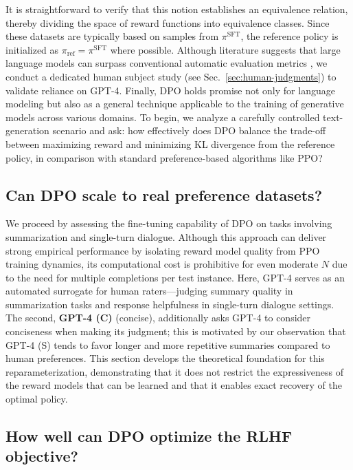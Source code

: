 \begin{sproof}
It is straightforward to verify that this notion establishes an equivalence relation, thereby dividing the space of reward functions into equivalence classes. Since these datasets are typically based on samples from $\pi^\text{SFT}$, the reference policy is initialized as $\pi_\text{ref} = \pi^\text{SFT}$ where possible. Although literature suggests that large language models can surpass conventional automatic evaluation metrics \citep{Chen2023ExploringTU}, we conduct a dedicated human subject study (see Sec.~\ref{sec:human-judgments}) to validate reliance on GPT-4. Finally, DPO holds promise not only for language modeling but also as a general technique applicable to the training of generative models across various domains. To begin, we analyze a carefully controlled text-generation scenario and ask: how effectively does DPO balance the trade-off between maximizing reward and minimizing KL divergence from the reference policy, in comparison with standard preference-based algorithms like PPO? \subsection{Can DPO scale to real preference datasets?}
\label{sec:dpo-real-datasets}
We proceed by assessing the fine-tuning capability of DPO on tasks involving summarization and single-turn dialogue. Although this approach can deliver strong empirical performance by isolating reward model quality from PPO training dynamics, its computational cost is prohibitive for even moderate $N$ due to the need for multiple completions per test instance. Here, GPT-4 serves as an automated surrogate for human raters—judging summary quality in summarization tasks and response helpfulness in single-turn dialogue settings. The second, \textbf{GPT-4 (C)} (concise), additionally asks GPT-4 to consider conciseness when making its judgment; this is motivated by our observation that GPT-4 (S) tends to favor longer and more repetitive summaries compared to human preferences. This section develops the theoretical foundation for this reparameterization, demonstrating that it does not restrict the expressiveness of the reward models that can be learned and that it enables exact recovery of the optimal policy. \subsection{How well can DPO optimize the RLHF objective?}


\end{sproof}

